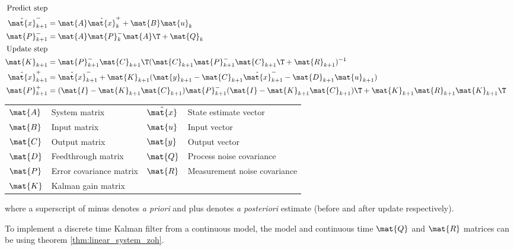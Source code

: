 \begin{theorem}
  \label{thm:kalman_filter}
  \begin{align}
    \text{Predict step} \nonumber \\
    \hat{\mat{x}}_{k+1}^- &= \mat{A}\hat{\mat{x}}_k^+ + \mat{B}\mat{u}_k \\
    \mat{P}_{k+1}^- &= \mat{A}\mat{P}_k^-\mat{A}\T + \mat{Q}_k \\
    \text{Update step} \nonumber \\
    \mat{K}_{k+1} &=
      \mat{P}_{k+1}^-\mat{C}_{k+1}\T
        (\mat{C}_{k+1}\mat{P}_{k+1}^-\mat{C}_{k+1}\T + \mat{R}_{k+1})^{-1} \\
    \hat{\mat{x}}_{k+1}^+ &=
      \hat{\mat{x}}_{k+1}^- + \mat{K}_{k+1}(\mat{y}_{k+1} -
      \mat{C}_{k+1}\hat{\mat{x}}_{k+1}^- - \mat{D}_{k+1}\mat{u}_{k+1}) \\
    \mat{P}_{k+1}^+ &= (\mat{I} - \mat{K}_{k+1}\mat{C}_{k+1})\mat{P}_{k+1}^-
      (\mat{I} - \mat{K}_{k+1}\mat{C}_{k+1})\T +
      \mat{K}_{k+1}\mat{R}_{k+1}\mat{K}_{k+1}\T
  \end{align}
  \begin{figurekey}
    \begin{tabular}{llll}
      $\mat{A}$ & System matrix & $\hat{\mat{x}}$ & State estimate vector \\
      $\mat{B}$ & Input matrix       & $\mat{u}$ & Input vector \\
      $\mat{C}$ & Output matrix      & $\mat{y}$ & Output vector \\
      $\mat{D}$ & Feedthrough matrix & $\mat{Q}$ & Process noise covariance \\
      $\mat{P}$ & Error covariance matrix & $\mat{R}$ & Measurement noise covariance \\
      $\mat{K}$ & Kalman gain matrix & &
    \end{tabular}
  \end{figurekey}

  where a superscript of minus denotes \textit{a priori} and plus denotes
  \textit{a posteriori} estimate (before and after update respectively).
\end{theorem}
\begin{remark}
  To implement a discrete time Kalman filter from a continuous model, the model
  and continuous time $\mat{Q}$ and $\mat{R}$ matrices can be
   using theorem
  \ref{thm:linear_system_zoh}.
\end{remark}

